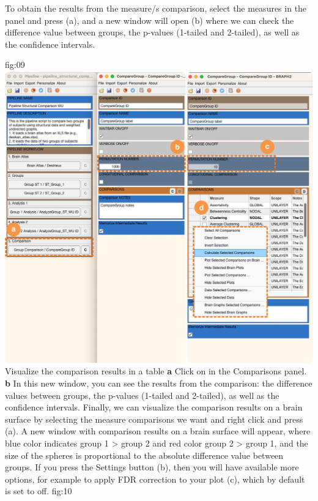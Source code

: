 \documentclass[justified]{tufte-handout}
\begin{document}
To obtain the results from the measure/s comparison, select the measures in the  panel and press ({a}), and a new window will open ({b}) where we can check the difference value between groups, the p-values (1-tailed and 2-tailed), as well as the confidence intervals.

	{fig:09}
	{
	\includegraphics{fig09.jpg}
	}
	{Visualize the comparison results in a table}
	{
	{\bf a} Click on  in the Comparisons panel.
	{\bf b} In this new window, you can see the results from the comparison: the difference values between groups, the p-values (1-tailed and 2-tailed), as well as the confidence intervals.
	}
Finally, we can visualize the comparison results on a brain surface by selecting the measure comparisons we want and right click and press  ({a}). A new window with comparison results on a brain surface will appear, where blue color indicates group 1 > group 2 and red color group 2 > group 1, and the size of the spheres is proportional to the absolute difference value between groups. If you press the Settings button ({b}), then you will have available more options, for example to apply FDR correction to your plot ({c}), which by default is set to off.
	{fig:10}
\end{document}
